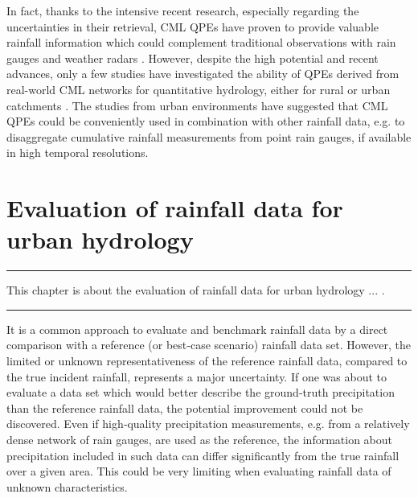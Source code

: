 \documentclass{ctuthesis}\usepackage[]{graphicx}\usepackage[]{color}
\begin{document}
In fact, thanks to the intensive recent research, especially regarding the uncertainties in their retrieval, CML QPEs have proven to provide valuable rainfall information which could complement traditional observations with rain gauges and weather radars \citep{chwalaCommercialMicrowaveLink2019, gossetImprovingRainfallMeasurement2016, imhoffRainfallNowcastingUsing2020, riosgaonaRainfallRetrievalCommercial2018, uijlenhoetOpportunisticRemoteSensing2018}. However, despite the high potential and recent advances, only a few studies have investigated the ability of QPEs derived from real-world CML networks for quantitative hydrology, either for rural \citep{brauerEffectDifferencesRainfall2016, cazzanigaCalculatingHydrologicalResponse2020, smiatekPotentialCommercialMicrowave2017} or urban catchments \citep{dischImpactDifferentSources2019, stranskyRunoffPredictionUsing2018}. The studies from urban environments have suggested that CML QPEs could be conveniently used in combination with other rainfall data, e.g. to disaggregate cumulative rainfall measurements from point rain gauges, if available in high temporal resolutions. 





        


\chapter{Evaluation of rainfall data for urban hydrology} \label{chap2_5}

\rule{\textwidth}{0.4pt}
This chapter is about the evaluation of rainfall data for urban hydrology ... . \newline
\rule[0.2cm]{\textwidth}{0.4pt}

It is a common approach \citep[e.g.][]{fenclCommercialMicrowaveLinks2015, fenclGaugeadjustedRainfallEstimates2017, riosgaonaMeasurementInterpolationUncertainties2015, grafRainfallEstimationGermanwide2020} to evaluate and benchmark rainfall data by a direct comparison with a reference (or best‐case scenario) rainfall data set. However, the limited or unknown representativeness of the reference rainfall data, compared to the true incident rainfall, represents a major uncertainty. If one was about to evaluate a data set which would better describe the ground‐truth precipitation than the reference rainfall data, the potential improvement could not be discovered. Even if high‐quality precipitation measurements, e.g. from a relatively dense network of rain gauges, are used as the reference, the information about precipitation included in such data can differ significantly from the true rainfall over a given area. This could be very limiting when evaluating rainfall data of unknown characteristics.
\end{document}
